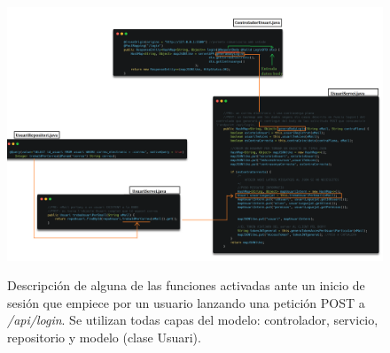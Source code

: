 \documentclass[a4paper,12pt]{report}
\begin{document}
				
				
				
				
				
				\FloatBarrier
				\setlength{\belowcaptionskip}{3pt}
				\begin{figure}[H]
					\centering
					\caption{Descripción de alguna de las funciones activadas ante un inicio de sesión que empiece por un usuario lanzando una petición POST a \textit{/api/login}. Se utilizan todas capas del modelo: controlador, servicio, repositorio y modelo (clase Usuari).}
					\includegraphics[width=1\linewidth]{img/esquemaArquitecturaSpringboot}
					\label{fig:esquemaArquitecturaSpringboot}
				\end{figure}
				\FloatBarrier
				
\end{document}
